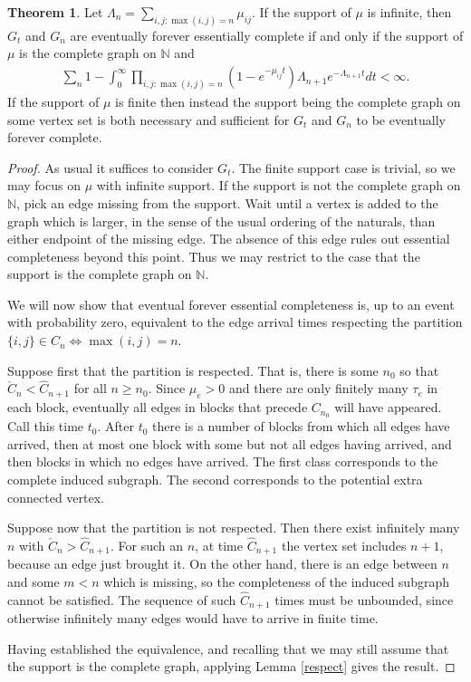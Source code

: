 \documentclass[12pt]{article}
\theoremstyle{definition}
\newtheorem{theorem}[proposition]{Theorem}
\begin{document}
\begin{theorem}

Let $\Lambda_{n} = \sum_{i,j: \max(i,j) = n}\mu_{ij}$. If the support of $\mu$ is infinite, then $G_t$ and $G_n$ are eventually forever essentially complete if and only if the support of $\mu$ is the complete graph on $\mathbb{N}$ and 
    \begin{align*}
        \sum_n 1-\int_{0}^\infty \prod_{i,j: \max(i,j)=n}(1-e^{-\mu_{ij}t})\Lambda_{n+1} e^{-\Lambda_{n+1}t}dt < \infty.
    \end{align*}If the support of $\mu$ is finite then instead the support being the complete graph on some vertex set is both necessary and sufficient for $G_t$ and $G_n$ to be eventually forever complete.
\end{theorem}
\begin{proof}
As usual it suffices to consider $G_t$. The finite support case is trivial, so we may focus on $\mu$ with infinite support. If the support is not the complete graph on $\mathbb{N}$, pick an edge missing from the support. Wait until a vertex is added to the graph which is larger, in the sense of the usual ordering of the naturals, than either endpoint of the missing edge. The absence of this edge rules out essential completeness beyond this point. Thus we may restrict to the case that the support is the complete graph on $\mathbb{N}$.

We will now show that eventual forever essential completeness is, up to an event with probability zero, equivalent to the edge arrival times respecting the partition $\{i,j\} \in C_n \Leftrightarrow  \max(i,j) = n$.

Suppose first that the partition is respected. That is, there is some $n_0$ so that $\check{C}_n < \hat{C}_{n+1}$ for all $n \geq n_0$. Since $\mu_e > 0$ and there are only finitely many $\tau_e$ in each block, eventually all edges in blocks that precede $C_{n_0}$ will have appeared. Call this time $t_0$. After $t_0$ there is a number of blocks from which all edges have arrived, then at most one block with some but not all edges having arrived, and then blocks in which no edges have arrived. The first class corresponds to the complete induced subgraph. The second corresponds to the potential extra connected vertex.

Suppose now that the partition is not respected. Then there exist infinitely many $n$ with $\check{C}_{n} > \hat{C}_{n+1}$. For such an $n$, at time $\hat{C}_{n+1}$ the vertex set includes $n+1$, because an edge just brought it. On the other hand, there is an edge between $n$ and some $m < n$ which is missing, so the completeness of the induced subgraph cannot be satisfied. The sequence of such $\hat{C}_{n+1}$ times must be unbounded, since otherwise infinitely many edges would have to arrive in finite time.

Having established the equivalence, and recalling that we may still assume that the support is the complete graph, applying Lemma \ref{respect} gives the result.
\end{proof}
\end{document}
